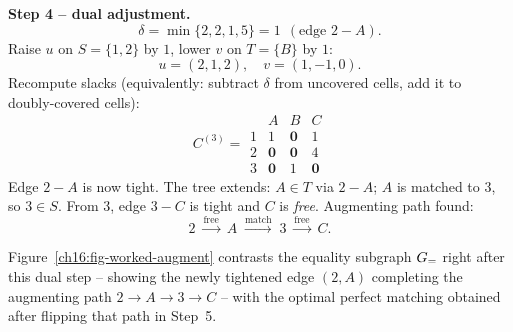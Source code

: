\textbf{Step 4 -- dual adjustment.}
\[
\delta=\min\{2,2,1,5\}=1\ \ (\text{edge } 2\!-\!A).
\]
Raise $u$ on $S=\{1,2\}$ by $1$, lower $v$ on $T=\{B\}$ by $1$:
\[
u=(2,1,2),\quad v=(1,-1,0).
\]
Recompute slacks (equivalently: subtract $\delta$ from uncovered cells, add it to doubly-covered cells):
\[
C^{(3)}=\begin{array}{c|ccc}
   & A & B & C\\\hline
 1 & 1 & \mathbf{0} & 1\\
 2 & \mathbf{0} & \mathbf{0} & 4\\
 3 & \mathbf{0} & 1 & \mathbf{0}
\end{array}
\]
Edge $2\!-\!A$ is now tight. The tree extends: $A\in T$ via $2\!-\!A$; $A$ is matched to $3$, so $3\in S$. From $3$, edge $3\!-\!C$ is tight and $C$ is \emph{free}. Augmenting path found:
\[
2 \;\xrightarrow{\text{free}}\; A \;\xrightarrow{\text{match}}\; 3 \;\xrightarrow{\text{free}}\; C.
\]

Figure~\ref{ch16:fig-worked-augment} contrasts the equality subgraph $G_=$ right after this dual step -- showing the newly tightened edge $(2,A)$ completing the augmenting path $2\to A\to 3\to C$ -- with the optimal perfect matching obtained after flipping that path in Step~5.

